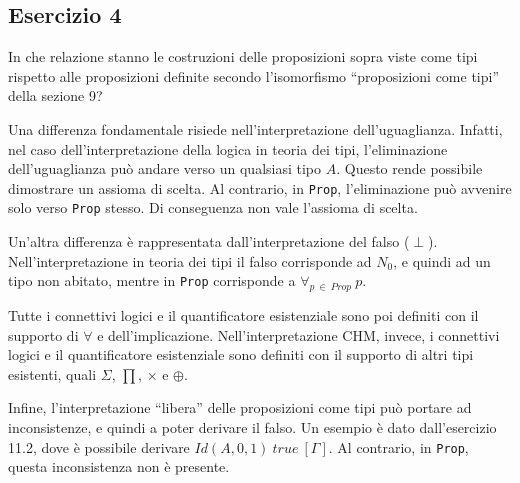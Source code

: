 \subsection{Esercizio 4}
\begin{thm}
	In che relazione stanno le costruzioni delle proposizioni sopra viste come tipi rispetto alle proposizioni definite secondo l'isomorfismo ``proposizioni come tipi'' della sezione 9?
\end{thm}
Una differenza fondamentale risiede nell'interpretazione dell'uguaglianza. Infatti, nel caso dell'interpretazione della logica in teoria dei tipi, l'eliminazione dell'uguaglianza può andare verso un qualsiasi tipo $A$. Questo rende possibile dimostrare un assioma di scelta. Al contrario, in \texttt{Prop}, l'eliminazione può avvenire solo verso \texttt{Prop} stesso. Di conseguenza non vale l'assioma di scelta.

Un'altra differenza è rappresentata dall'interpretazione del falso ($\perp$). Nell'interpretazione in teoria dei tipi il falso corrisponde ad $N_0$, e quindi ad un tipo non abitato, mentre in \texttt{Prop} corrisponde a $\forall_{p~\in~Prop}~p$. 

Tutte i connettivi logici e il quantificatore esistenziale sono poi definiti con il supporto di $\forall$ e dell'implicazione. Nell'interpretazione CHM, invece, i connettivi logici e il quantificatore esistenziale sono definiti con il supporto di altri tipi esistenti, quali $\Sigma$, $\prod$, $\times$ e $\oplus$. 

Infine, l'interpretazione ``libera'' delle proposizioni come tipi può portare ad inconsistenze, e quindi a poter derivare il falso. Un esempio è dato dall'esercizio 11.2, dove è possibile derivare $Id(A, 0, 1)~true~[\Gamma]$. Al contrario, in \texttt{Prop}, questa inconsistenza non è presente.